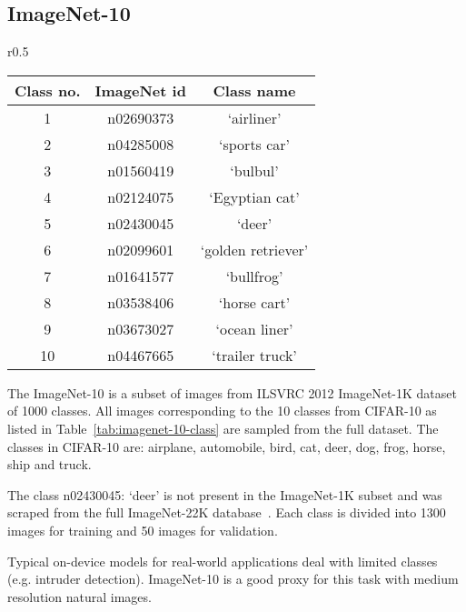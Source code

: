 \documentclass[10pt]{article}
\begin{document}
\subsection{ImageNet-10}
\begin{wraptable}{r}{0.5\columnwidth}
\vspace{-8mm}
\centering
\caption{\small Classes in ImageNet-10 dataset.}
\begin{tabular}{@{}ccc@{}}
\toprule
Class no. & ImageNet id                      & Class name                                \\ \midrule
1         & {n02690373} & {`airliner'}         \\
2         & {n04285008} & {`sports car'}       \\
3         & {n01560419} & {`bulbul'}           \\
4         & {n02124075} & {`Egyptian cat'}     \\
5         & {n02430045} & {`deer'}             \\
6         & {n02099601} & {`golden retriever'} \\
7         & {n01641577} & {`bullfrog'}         \\
8         & {n03538406} & {`horse cart'}       \\
9         & {n03673027} & {`ocean liner'}      \\
10        & {n04467665} & {`trailer truck'}    \\ \bottomrule
\end{tabular}
\label{tab:imagenet-10-class}
\vspace{-6mm}
\end{wraptable}  The ImageNet-10 is a subset of
images from ILSVRC 2012 ImageNet-1K
dataset~\citep{russakovsky2015imagenet} of 1000 classes. All images
corresponding to the 10 classes from CIFAR-10 as listed in
Table~\ref{tab:imagenet-10-class} are sampled from the full
dataset. The classes in CIFAR-10 are: airplane, automobile, bird, cat,
deer, dog, frog, horse, ship and truck.

The class n02430045: `deer' is not present in the ImageNet-1K subset
and was scraped from the full ImageNet-22K
database~\citep{deng2009imagenet}. Each class is divided into 1300
images for training and 50 images for validation.

Typical on-device models for real-world applications deal with limited
classes (e.g. intruder detection). ImageNet-10 is a good proxy for
this task with medium resolution natural images.
\end{document}
